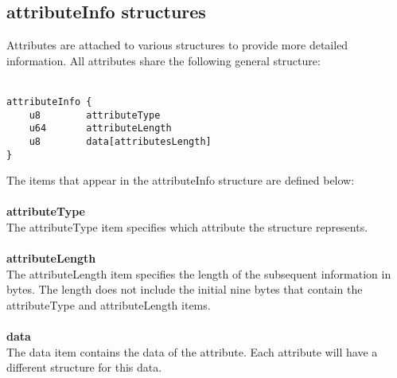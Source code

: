 \documentclass[12pt]{article}
\newcommand*{\formalfont}{\fontfamily{ptm}\selectfont}
\newcommand\tab[1][1cm]{\hspace*{#1}}
\begin{document}
		\subsection{attributeInfo structures}
			Attributes are attached to various structures to provide more detailed information. All attributes share the following general structure: \\ \\
			\begin{Verbatim}[frame=single]
attributeInfo {	
	u8        attributeType
	u64       attributeLength
	u8        data[attributesLength]
}
			\end{Verbatim}
			The items that appear in the {\formalfont attributeInfo} structure are defined below: \\ \\
			\textbf{attributeType} \\
				\tab The {\formalfont attributeType} item specifies which attribute the structure represents. \\ \\
			\textbf{attributeLength} \\
				\tab The {\formalfont attributeLength} item specifies the length of the subsequent information in bytes. The length does not include the initial nine bytes that contain the attributeType and attributeLength items. \\ \\
			\textbf{data} \\
				\tab The {\formalfont data} item contains the data of the attribute. Each attribute will have a different structure for this data. \\ \\
			
\end{document}
